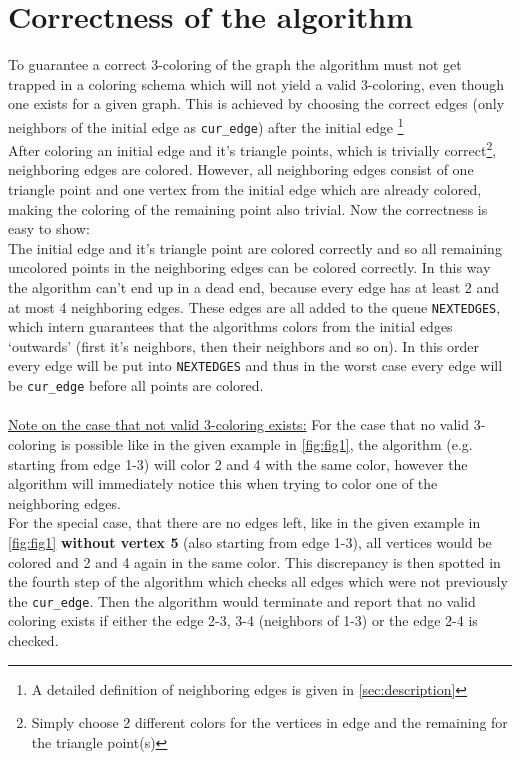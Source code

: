 \documentclass[english]{scrartcl}
\newcommand{\code}{\texttt}
\begin{document}
\section{Correctness of the algorithm}
\label{sec:correctness}
To guarantee a correct 3-coloring of the graph the algorithm must not get trapped in a coloring schema which will not yield a valid 3-coloring, even though one exists for a given graph. This is achieved by choosing the correct edges (only neighbors of the initial edge as \code{cur\_edge}) after the initial edge \footnote{A detailed definition of neighboring edges is given in \autoref{sec:description} } \\After coloring an initial edge and it's triangle points, which is trivially correct\footnote{Simply choose 2 different colors for the vertices in edge and the remaining for the triangle point(s)}, neighboring edges are colored. However, all neighboring edges consist of one triangle point  and one vertex from the initial edge which are already colored, making the coloring of the remaining point also trivial. Now the correctness is easy to show:\\ The initial edge and it's triangle point are colored correctly and so all remaining uncolored points in the neighboring edges can be colored correctly. In this way the algorithm can't end up in a dead end, because every edge has at least 2 and at most 4 neighboring edges. These edges are all added to the queue \code{NEXTEDGES}, which intern guarantees that the algorithms colors from the initial edges \enquote*{outwards} (first it's neighbors, then their neighbors and so on). In this order every edge will be put into \code{NEXTEDGES} and thus in the worst case every edge will be \code{cur\_edge} before all points are colored. \\ \\
\underline{Note on the case that not valid 3-coloring exists:} For the case that no valid 3-coloring is possible like in the given example in \autoref{fig:fig1}, the algorithm (e.g. starting from edge 1-3) will color 2 and 4 with the same color, however the algorithm will immediately notice this when trying to color one of the neighboring edges. \\ For the special case, that there are no edges left, like in the given example in \autoref{fig:fig1} \textbf{without vertex 5} (also starting from edge 1-3), all vertices would be colored and 2 and 4 again in the same color. This discrepancy is then spotted in the fourth step of the algorithm which checks all edges which were not previously the \code{cur\_edge}. Then the algorithm would terminate and report that no valid coloring exists if either the edge 2-3, 3-4 (neighbors of 1-3) or the edge 2-4 is checked.





\clearpage


\end{document}
